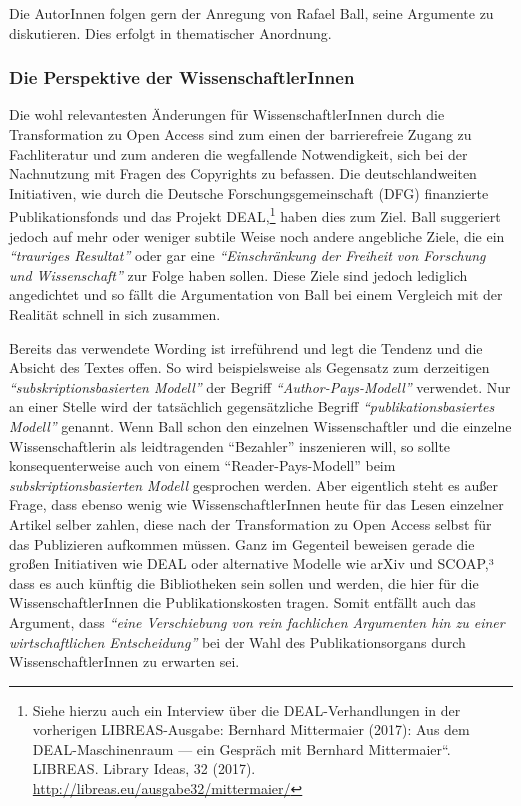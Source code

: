 \documentclass[a4paper,
fontsize=11pt,
oneside,
numbers=noperiodatend,
parskip=half-,
bibliography=totoc,
final
]{scrartcl}
\begin{document}
Die AutorInnen folgen gern der Anregung von Rafael Ball, seine Argumente
zu diskutieren. Dies erfolgt in thematischer Anordnung.

\hypertarget{die-perspektive-der-wissenschaftlerinnen}{%
\subsubsection{Die Perspektive der
WissenschaftlerInnen}\label{die-perspektive-der-wissenschaftlerinnen}}

Die wohl relevantesten Änderungen für WissenschaftlerInnen durch die
Transformation zu Open Access sind zum einen der barrierefreie Zugang zu
Fachliteratur und zum anderen die wegfallende Notwendigkeit, sich bei
der Nachnutzung mit Fragen des Copyrights zu befassen. Die
deutschlandweiten Initiativen, wie durch die Deutsche
Forschungsgemeinschaft (DFG) finanzierte Publikationsfonds und das
Projekt DEAL,\footnote{Siehe hierzu auch ein Interview über die
  DEAL-Verhandlungen in der vorherigen LIBREAS-Ausgabe: Bernhard
  Mittermaier (2017): Aus dem DEAL-Maschinenraum --- ein Gespräch mit
  Bernhard Mittermaier``. LIBREAS. Library Ideas, 32 (2017).
  \url{http://libreas.eu/ausgabe32/mittermaier/}} haben dies zum Ziel.
Ball suggeriert jedoch auf mehr oder weniger subtile Weise noch andere
angebliche Ziele, die ein \emph{\enquote{trauriges Resultat}} oder gar
eine \emph{\enquote{Einschränkung der Freiheit von Forschung und
Wissenschaft}} zur Folge haben sollen. Diese Ziele sind jedoch lediglich
angedichtet und so fällt die Argumentation von Ball bei einem Vergleich
mit der Realität schnell in sich zusammen.

Bereits das verwendete Wording ist irreführend und legt die Tendenz und
die Absicht des Textes offen. So wird beispielsweise als Gegensatz zum
derzeitigen \emph{\enquote{subskriptionsbasierten Modell}} der Begriff
\emph{\enquote{Author-Pays-Modell}} verwendet. Nur an einer Stelle wird
der tatsächlich gegensätzliche Begriff
\emph{\enquote{publikationsbasiertes Modell}} genannt. Wenn Ball schon
den einzelnen Wissenschaftler und die einzelne Wissenschaftlerin als
leidtragenden \enquote{Bezahler} inszenieren will, so sollte
konsequenterweise auch von einem \enquote{Reader-Pays-Modell} beim
\emph{subskriptionsbasierten Modell} gesprochen werden. Aber eigentlich
steht es außer Frage, dass ebenso wenig wie WissenschaftlerInnen heute
für das Lesen einzelner Artikel selber zahlen, diese nach der
Transformation zu Open Access selbst für das Publizieren aufkommen
müssen. Ganz im Gegenteil beweisen gerade die großen Initiativen wie
DEAL oder alternative Modelle wie arXiv und SCOAP,³ dass es auch künftig
die Bibliotheken sein sollen und werden, die hier für die
WissenschaftlerInnen die Publikationskosten tragen. Somit entfällt auch
das Argument, dass \emph{\enquote{eine Verschiebung von rein fachlichen
Argumenten hin zu einer wirtschaftlichen Entscheidung}} bei der Wahl des
Publikationsorgans durch WissenschaftlerInnen zu erwarten sei.
\end{document}
